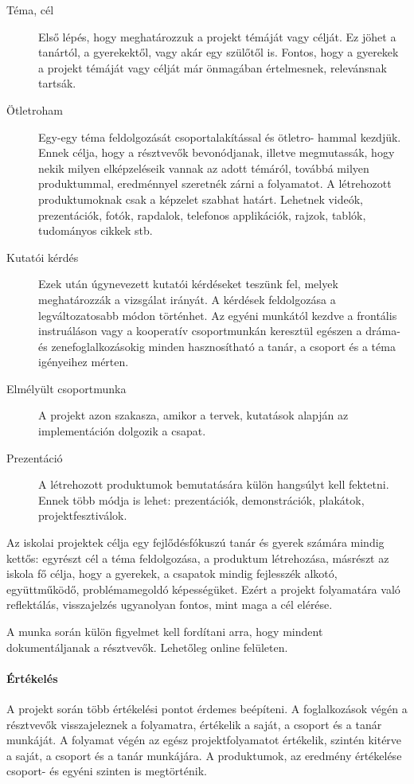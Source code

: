 \begin{description}
      \item[Téma, cél] Első lépés, hogy meghatározzuk a projekt témáját vagy
            célját. Ez jöhet a tanártól, a gyerekektől, vagy akár egy szülőtől is. Fontos, hogy a gyerekek a projekt témáját vagy célját már önmagában értelmesnek, relevánsnak tartsák.

      \item [Ötletroham]  Egy-egy téma feldolgozását csoportalakítással és
        ötletro-\linebreak
        hammal kezdjük. Ennek célja, hogy a résztvevők bevonódjanak, illetve megmutassák, hogy nekik milyen elképzeléseik vannak az a\-dott témáról, továbbá milyen produktummal, eredménnyel szeretnék zárni a folyamatot. A létrehozott produktumoknak csak a képzelet szabhat határt. Lehetnek videók, prezentációk, fotók, rapdalok, telefonos applikációk, rajzok, tablók, tudományos cikkek stb. 

      \item [Kutatói kérdés] Ezek után úgynevezett kutatói kérdéseket teszünk
            fel, melyek meghatározzák a vizsgálat irányát. A kérdések feldolgozása a legváltozatosabb módon történhet. Az egyéni munkától kezdve a frontális instruáláson vagy a kooperatív csoportmunkán keresztül egészen a dráma- és zenefoglalkozásokig minden hasznosítható a tanár, a csoport és a téma igényeihez mérten.
      \item [Elmélyült csoportmunka] A projekt azon szakasza, amikor a tervek,
            kutatások alapján az implementáción dolgozik a csapat.
      \item [Prezentáció] A létrehozott produktumok bemutatására külön
            hangsúlyt kell fektetni. Ennek több módja is lehet: prezentációk, demonstrációk, plakátok, projektfesztiválok.
\end{description}

Az iskolai projektek célja egy fejlődésfókuszú tanár és gyerek számára mindig kettős: egyrészt cél a téma feldolgozása, a produktum létrehozása, másrészt az iskola fő célja, hogy a gyerekek, a csapatok mindig fejlesszék alkotó, együttműködő, problémamegoldó képességüket. Ezért a projekt folyamatára való reflektálás, visszajelzés ugyanolyan fontos, mint maga a cél elérése.

A munka során külön figyelmet kell fordítani arra, hogy mindent dokumentáljanak a résztvevők. Lehetőleg online felületen.

\paragraph{Értékelés} A projekt során több értékelési pontot érdemes beépíteni.
A foglalkozások végén a résztvevők visszajeleznek a folyamatra, értékelik a saját, a csoport és a tanár munkáját. A folyamat végén az egész projektfolyamatot értékelik, szintén kitérve a saját, a csoport és a tanár munkájára. A produktumok, az eredmény értékelése csoport- és egyéni szinten is megtörténik.

